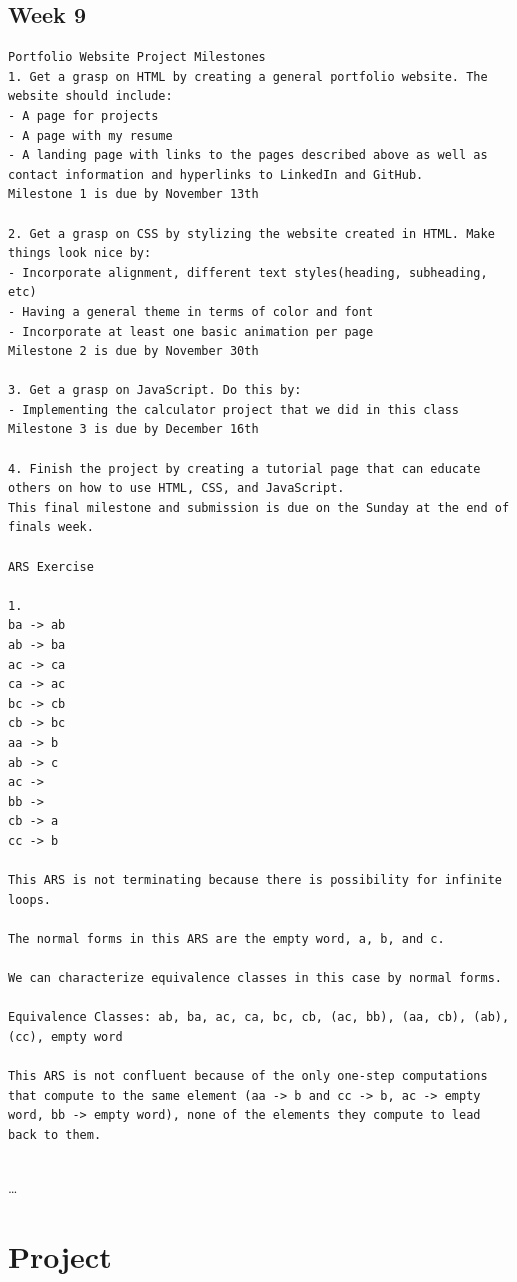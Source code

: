 \documentclass{article}
\theoremstyle{theorem}
\theoremstyle{definition}
\theoremstyle{remark}
\begin{document}
\subsection{Week 9}
\begin{verbatim}
Portfolio Website Project Milestones
1. Get a grasp on HTML by creating a general portfolio website. The website should include: 
- A page for projects
- A page with my resume
- A landing page with links to the pages described above as well as contact information and hyperlinks to LinkedIn and GitHub.
Milestone 1 is due by November 13th

2. Get a grasp on CSS by stylizing the website created in HTML. Make things look nice by:
- Incorporate alignment, different text styles(heading, subheading, etc)
- Having a general theme in terms of color and font
- Incorporate at least one basic animation per page
Milestone 2 is due by November 30th

3. Get a grasp on JavaScript. Do this by: 
- Implementing the calculator project that we did in this class
Milestone 3 is due by December 16th

4. Finish the project by creating a tutorial page that can educate others on how to use HTML, CSS, and JavaScript.
This final milestone and submission is due on the Sunday at the end of finals week.

ARS Exercise

1.
ba -> ab
ab -> ba
ac -> ca
ca -> ac
bc -> cb
cb -> bc
aa -> b
ab -> c
ac ->  
bb ->
cb -> a
cc -> b

This ARS is not terminating because there is possibility for infinite loops.

The normal forms in this ARS are the empty word, a, b, and c.

We can characterize equivalence classes in this case by normal forms. 

Equivalence Classes: ab, ba, ac, ca, bc, cb, (ac, bb), (aa, cb), (ab), (cc), empty word

This ARS is not confluent because of the only one-step computations that compute to the same element (aa -> b and cc -> b, ac -> empty word, bb -> empty word), none of the elements they compute to lead back to them.


\end{verbatim}

\ldots

\section{Project}
\end{document}

